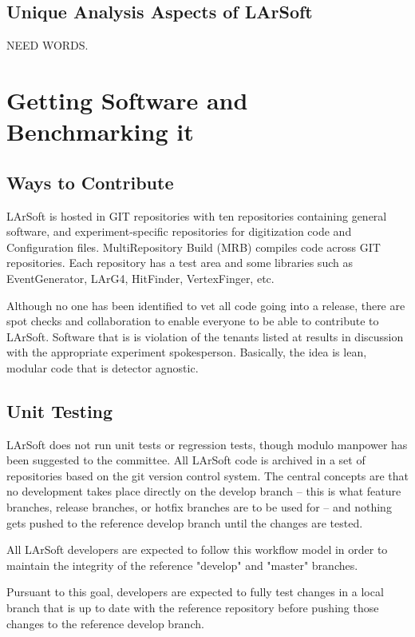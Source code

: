\documentclass[12pt]{elsarticle}
\begin{document}
\subsection{Unique Analysis Aspects of LArSoft}
NEED WORDS.

\section{Getting Software and Benchmarking it}
\subsection{Ways to Contribute}

LArSoft is hosted in GIT repositories with ten repositories containing general software, and experiment-specific repositories for digitization code and Configuration files. MultiRepository Build (MRB) compiles code across GIT repositories. Each repository has a test area and some libraries such as EventGenerator, LArG4, HitFinder, VertexFinger, etc.\cite{gian}

Although no one has been identified to vet all code going into a release, there are spot checks and collaboration to enable everyone to be able to contribute to LArSoft. Software that is is violation of the tenants listed at \cite{code tenants} results in discussion with the appropriate experiment spokesperson. Basically, the idea is lean, modular code that is detector agnostic.  

\subsection{Unit Testing}
LArSoft does not run unit tests or regression tests, though modulo manpower has been suggested to the committee.
All LArSoft code is archived in a set of repositories based on the git version control system.
The central concepts are that no development takes place directly on the develop branch -- this is what feature branches, release branches, or hotfix branches are to be used for -- and nothing gets pushed to the reference develop branch until the changes are tested.\cite{git-control}

All LArSoft developers are expected to follow this workflow model in order to maintain the integrity of the reference "develop" and "master" branches.

Pursuant to this goal, developers are expected to fully test changes in a local branch that is up to date with the reference repository before pushing those changes to the reference develop branch. 
\end{document}

